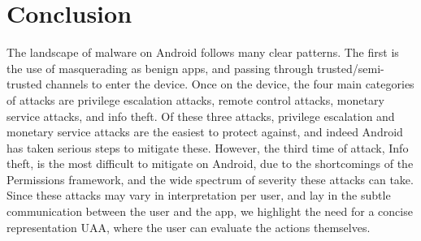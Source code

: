 \section{Conclusion}
The landscape of malware on Android follows many clear patterns. The first is the use of masquerading as benign apps, and passing through trusted/semi-trusted channels to enter the device. Once on the device, the four main categories of attacks are privilege escalation attacks, remote control attacks, monetary service attacks, and info theft. Of these three attacks, privilege escalation and monetary service attacks are the easiest to protect against, and indeed Android has taken serious steps to mitigate these. However, the third time of attack, Info theft, is the most difficult to mitigate on Android, due to the shortcomings of the Permissions framework, and the wide spectrum of severity these attacks can take. Since these attacks may vary in interpretation per user, and lay in the subtle communication between the user and the app, we highlight the need for a concise representation UAA, where the user can evaluate the actions themselves.
